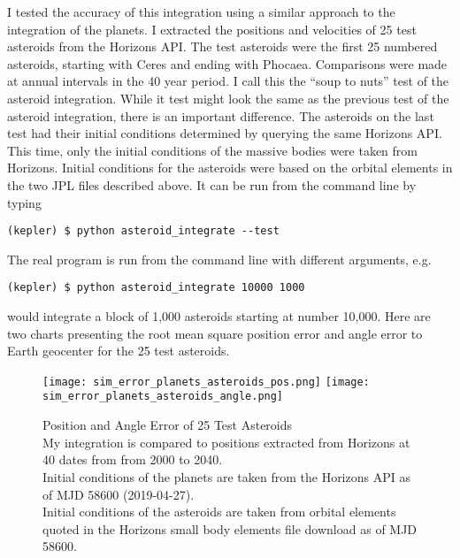 I tested the accuracy of this integration using a similar approach to the integration of the planets.
I extracted the positions and velocities of 25 test asteroids from the Horizons API.
The test asteroids were the first 25 numbered asteroids, starting with Ceres and ending with Phocaea.
Comparisons were made at annual intervals in the 40 year period.
I call this the ``soup to nuts'' test of the asteroid integration.
While it test might look the same as the previous test of the asteroid integration, there is an important difference.
The asteroids on the last test had their initial conditions determined by querying the same Horizons API.
This time, only the initial conditions of the massive bodies were taken from Horizons.
Initial conditions for the asteroids were based on the orbital elements in the two JPL files described above.
It can be run from the command line by typing
\begin{lstlisting}[style=CodeSnippet]
(kepler) $ python asteroid_integrate --test
\end{lstlisting}
The real program is run from the command line with different arguments, e.g. 
\begin{lstlisting}[style=CodeSnippet]
(kepler) $ python asteroid_integrate 10000 1000
\end{lstlisting}
would integrate a block of 1,000 asteroids starting at number 10,000. 
Here are two charts presenting the root mean square position error and angle error to Earth geocenter for the 25 test asteroids.
\begin{figure}[hbt!]
\begin{center}
\texttt{[image: sim\_error\_planets\_asteroids\_pos.png]}
\texttt{[image: sim\_error\_planets\_asteroids\_angle.png]}
\caption{Position and Angle Error of 25 Test Asteroids\\
My integration is compared to positions extracted from Horizons at 40 dates from from 2000 to 2040.\\
Initial conditions of the planets are taken from the Horizons API as of MJD 58600 (2019-04-27). \\
Initial conditions of the asteroids are taken from orbital elements quoted in the 
Horizons small body elements file download as of MJD 58600.}
\end{center}
\end{figure}
\clearpage

